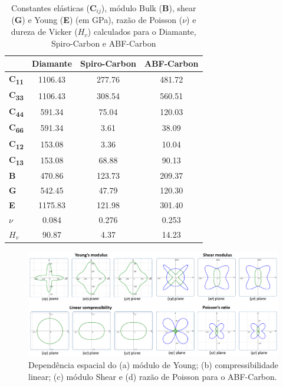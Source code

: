 		\begin{table}[ht]
			\centering
			\renewcommand{\arraystretch}{1.1}
			\caption{Constantes elásticas ($\textbf{C}_{ij}$), módulo Bulk (\textbf{B}), shear (\textbf{G}) e Young (\textbf{E}) (em GPa), razão de Poisson ($\nu$) e dureza de Vicker ($H_v$) calculados para o Diamante, Spiro-Carbon e ABF-Carbon}
			\label{elastic_ABF}
			\begin{tabular}{lccc}
				\hline \hline
				& Diamante & Spiro-Carbon & ABF-Carbon \\\hline
				\textbf{C\textsubscript{11}} & 1106.43   & 277.76   & 481.72  \\
				\textbf{C\textsubscript{33}} & 1106.43   & 308.54   & 560.51  \\
				\textbf{C\textsubscript{44}} &  591.34   & 75.04    & 120.03  \\
				\textbf{C\textsubscript{66}} &  591.34   & 3.61     &  38.09  \\
				\textbf{C\textsubscript{12}} &  153.08   & 3.36     &  10.04  \\
				\textbf{C\textsubscript{13}} &  153.08   & 68.88    &  90.13  \\
				\textbf{B}                   &  470.86   & 123.73   & 209.37  \\
				\textbf{G}                   &  542.45   & 47.79    & 120.30  \\
				\textbf{E}                   & 1175.83   & 121.98   & 301.40  \\
				\textbf{$\nu$}               &   0.084   & 0.276    & 0.253   \\
				\textbf{$H_v$}               &   90.87   & 4.37    & 14.23   \\
				\hline \hline
			\end{tabular}
			\noindent
		\end{table}
		
		
		
		\begin{figure}[!ht]
			\centering
			\includegraphics[width=1\linewidth]{capitulos/fig/results2/elastic_abf}
			\caption{Dependência espacial do (a) módulo de Young; (b) compressibilidade linear; (c) módulo Shear e (d) razão de Poisson para o ABF-Carbon.}
			\label{plot_elastic_ABF}
		\end{figure}
		
